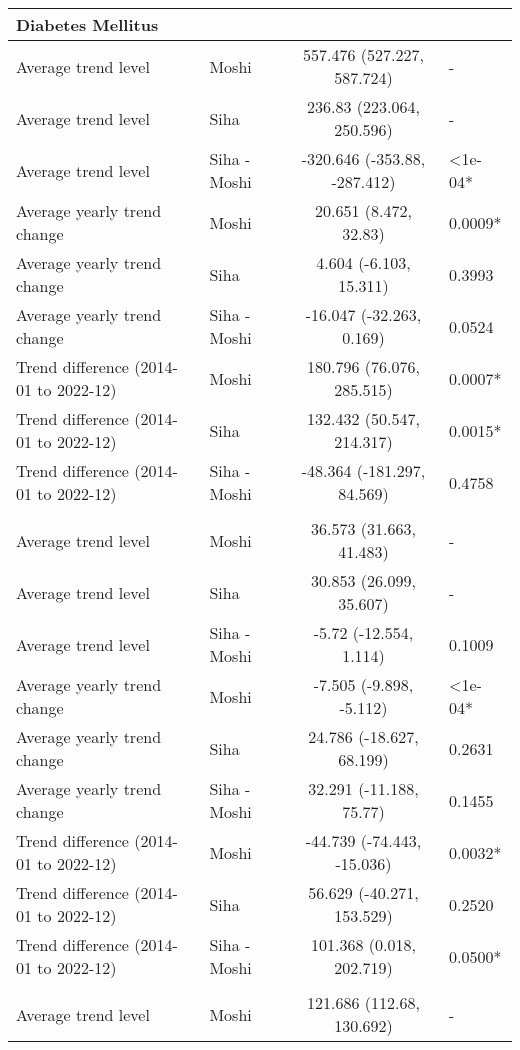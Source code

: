 \begin{longtable}{l|lcl}
\multicolumn{4}{l}{Diabetes Mellitus} \\ 
\midrule\addlinespace[2.5pt]
Average trend level & Moshi & 557.476 (527.227, 587.724) & - \\ 
Average trend level & Siha & 236.83 (223.064, 250.596) & - \\ 
Average trend level & Siha - Moshi & -320.646 (-353.88, -287.412) & <1e-04* \\ 
Average yearly trend change & Moshi & 20.651 (8.472, 32.83) & 0.0009* \\ 
Average yearly trend change & Siha & 4.604 (-6.103, 15.311) & 0.3993 \\ 
Average yearly trend change & Siha - Moshi & -16.047 (-32.263, 0.169) & 0.0524 \\ 
Trend difference (2014-01 to 2022-12) & Moshi & 180.796 (76.076, 285.515) & 0.0007* \\ 
Trend difference (2014-01 to 2022-12) & Siha & 132.432 (50.547, 214.317) & 0.0015* \\ 
Trend difference (2014-01 to 2022-12) & Siha - Moshi & -48.364 (-181.297, 84.569) & 0.4758 \\ 
\midrule\addlinespace[2.5pt]
\multicolumn{4}{l}{Dysentery} \\ 
\midrule\addlinespace[2.5pt]
Average trend level & Moshi & 36.573 (31.663, 41.483) & - \\ 
Average trend level & Siha & 30.853 (26.099, 35.607) & - \\ 
Average trend level & Siha - Moshi & -5.72 (-12.554, 1.114) & 0.1009 \\ 
Average yearly trend change & Moshi & -7.505 (-9.898, -5.112) & <1e-04* \\ 
Average yearly trend change & Siha & 24.786 (-18.627, 68.199) & 0.2631 \\ 
Average yearly trend change & Siha - Moshi & 32.291 (-11.188, 75.77) & 0.1455 \\ 
Trend difference (2014-01 to 2022-12) & Moshi & -44.739 (-74.443, -15.036) & 0.0032* \\ 
Trend difference (2014-01 to 2022-12) & Siha & 56.629 (-40.271, 153.529) & 0.2520 \\ 
Trend difference (2014-01 to 2022-12) & Siha - Moshi & 101.368 (0.018, 202.719) & 0.0500* \\ 
\midrule\addlinespace[2.5pt]
\multicolumn{4}{l}{Epilepsy} \\ 
\midrule\addlinespace[2.5pt]
Average trend level & Moshi & 121.686 (112.68, 130.692) & - \\ 

\end{longtable}
